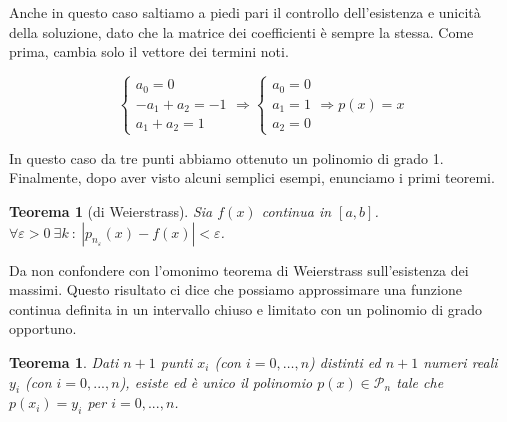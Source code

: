 \documentclass{article}
\theoremstyle{plain}
\newtheorem{teorema}{Teorema}
\theoremstyle{plain}
\newtheorem*{teorema*}{Teorema}
\theoremstyle{definition}
\theoremstyle{definition}
\begin{document}
Anche in questo caso saltiamo a piedi pari il controllo dell'esistenza e unicità della soluzione, dato che la matrice dei coefficienti è sempre la stessa. Come prima, cambia solo il vettore dei termini noti.

\[
\begin{cases}
	a_{0} = 0 \\
	-a_{1}+a_{2} = -1 \\
	a_{1}+a_{2} = 1
\end{cases}
\Rightarrow
\begin{cases}
	a_{0} = 0 \\
	a_{1} = 1 \\
	a_{2} = 0
\end{cases}
\Rightarrow
p(x)=x
\]

In questo caso da tre punti abbiamo ottenuto un polinomio di grado 1. Finalmente, dopo aver visto alcuni semplici esempi, enunciamo i primi teoremi.

\begin{teorema*}[di Weierstrass]
	Sia $f(x)$ continua in $[a,b]$.  $\forall \varepsilon >0 \ \exists k \ : \ |p_{n_{\varepsilon}}(x) - f(x)| < \varepsilon$.
\end{teorema*}

Da non confondere con l'omonimo teorema di Weierstrass sull'esistenza dei massimi. Questo risultato ci dice che possiamo approssimare una funzione continua definita in un intervallo chiuso e limitato con un polinomio di grado opportuno.

\begin{teorema}
	Dati $n+1$ punti $x_{i}$ (con $i=0, \dots, n$) distinti ed $n+1$ numeri reali $y_{i}$ (con $i=0, ..., n$), esiste ed è unico il polinomio $p(x) \in \mathcal{P}_{n}$ tale che $p(x_{i})=y_{i}$ per $i=0,...,n$.
\end{teorema}
\end{document}
